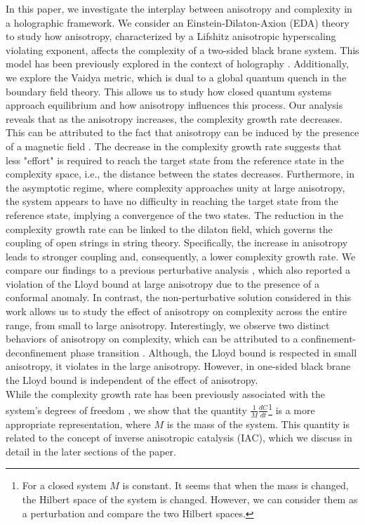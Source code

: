 \documentclass[]{article}
\begin{document}
In this paper, we investigate the interplay between anisotropy and complexity in a holographic framework. We consider an Einstein-Dilaton-Axion (EDA) theory to study how anisotropy, characterized by a Lifshitz anisotropic hyperscaling violating exponent, affects the complexity of a two-sided black brane system. This model has been previously explored in the context of holography \cite{EDA1,2,3,EDA2}. Additionally, we explore the Vaidya metric, which is dual to a global quantum quench in the boundary field theory. This allows us to study how closed quantum systems approach equilibrium and how anisotropy influences this process. Our analysis reveals that as the anisotropy increases, the complexity growth rate decreases. This can be attributed to the fact that anisotropy can be induced by the presence of a magnetic field \cite{e1,e11,e12,e13,e14,e15,e16,e2}. The decrease in the complexity growth rate suggests that less "effort" is required to reach the target state from the reference state in the complexity space, i.e., the distance between the states decreases. Furthermore, in the asymptotic regime, where complexity approaches unity at large anisotropy, the system appears to have no difficulty in reaching the target state from the reference state, implying a convergence of the two states. The reduction in the complexity growth rate can be linked to the dilaton field, which governs the coupling of open strings in string theory. Specifically, the increase in anisotropy leads to stronger coupling and, consequently, a lower complexity growth rate. We compare our findings to a previous perturbative analysis \cite{strong}, which also reported a violation of the Lloyd bound at large anisotropy due to the presence of a conformal anomaly. In contrast, the non-perturbative solution considered in this work allows us to study the effect of anisotropy on complexity across the entire range, from small to large anisotropy. Interestingly, we observe two distinct behaviors of anisotropy on complexity, which can be attributed to a confinement-deconfinement phase transition \cite{strong}. Although, the Lloyd bound is respected in small anisotropy, it violates in the large anisotropy. However, in one-sided black brane the Lloyd bound is independent of the effect of anisotropy.\\ 

While the complexity growth rate has been previously associated with the system's degrees of freedom \cite{qcd}, we show that the quantity $\frac{1}{M}\frac{dC}{dt}$\footnote{For a closed system $M$ is constant. It seems that when the mass is changed, the Hilbert space of the system is changed. However, we can consider them as a perturbation and compare the two Hilbert spaces.} is a more appropriate representation, where $M$  is the mass of the system. This quantity is related to the concept of inverse anisotropic catalysis (IAC), which we discuss in detail in the later sections of the paper.\\
\end{document}
